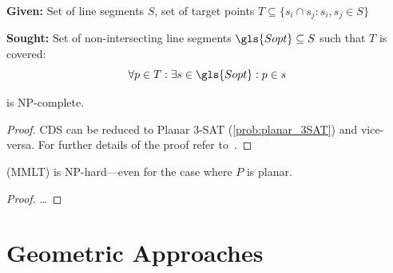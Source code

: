 
\begin{problem}
  \label{prob:cds}\hfill
  \begin{labeling}{\hspace{4em}}
    \item[\textbf{Given:}]
      Set of line segments \(S\), 
      set of target points
      \(T \subseteq \{ s_i \cap s_j : s_i,s_j \in S \} \)
    \item[\textbf{Sought:}]
      Set of non-intersecting line segments
      \(\gls{Sopt} \subseteq S\) such that \(T\) is covered:
      \[ \forall p \in T: \exists s \in \gls{Sopt} : p \in s \]
  \end{labeling}
\end{problem}


\begin{theorem}
   is NP-complete.
\end{theorem}

\begin{proof}
  \gls{CDS} can be reduced to Planar 3-SAT (\cref{prob:planar_3SAT})
  and vice-versa. For further details of the proof refer
  to~\cite{mmlt_complexity}.
\end{proof}


\begin{theorem}
   (\gls{MMLT}) is NP-hard---even for the case
  where \(P\) is planar.
\end{theorem}

\begin{proof}
  \ldots{}
\end{proof}

\section{Geometric Approaches}



